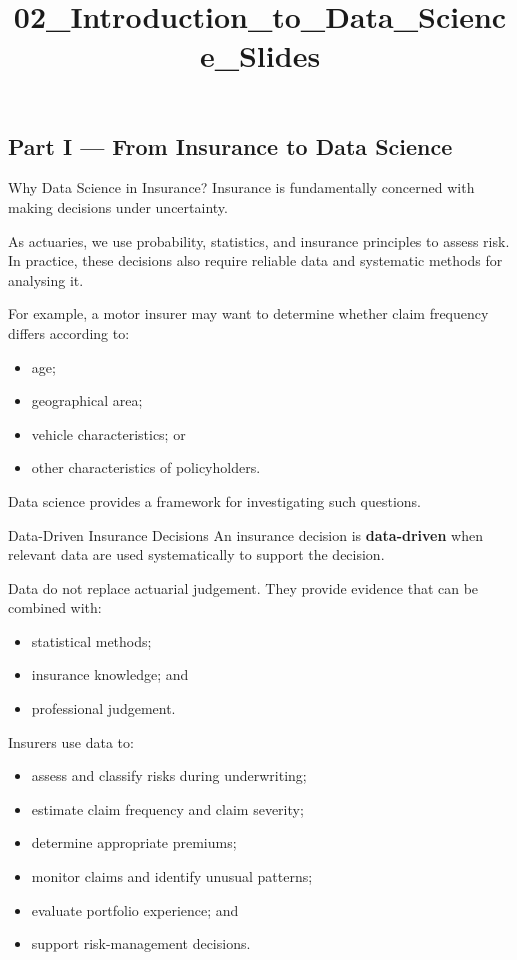 \documentclass[
  ignorenonframetext,
  aspectratio=169,
]{beamer}
\title{\texorpdfstring{02\_Introduction\_to\_Data\_Science\_Slides}{02\_Introduction\_to\_Data\_Science\_Slides}}
\author{}
\date{}
\providecommand{\tightlist}{%
  \setlength{\itemsep}{0pt}\setlength{\parskip}{0pt}}
\begin{document}
\frame{\titlepage}


\subsection{Part I --- From Insurance to Data
Science}\label{part-i-from-insurance-to-data-science}

\begin{frame}{Why Data Science in Insurance?}
\protect{}\label{why-data-science-in-insurance}
Insurance is fundamentally concerned with making decisions under
uncertainty.

As actuaries, we use probability, statistics, and insurance principles
to assess risk. In practice, these decisions also require reliable data
and systematic methods for analysing it.

For example, a motor insurer may want to determine whether claim
frequency differs according to:

\begin{itemize}
\tightlist
\item
  age;
\item
  geographical area;
\item
  vehicle characteristics; or
\item
  other characteristics of policyholders.
\end{itemize}

Data science provides a framework for investigating such questions.
\end{frame}

\begin{frame}{Data-Driven Insurance Decisions}
\protect{}\label{data-driven-insurance-decisions}
An insurance decision is \textbf{data-driven} when relevant data are
used systematically to support the decision.

Data do not replace actuarial judgement. They provide evidence that can
be combined with:

\begin{itemize}
\tightlist
\item
  statistical methods;
\item
  insurance knowledge; and
\item
  professional judgement.
\end{itemize}

Insurers use data to:

\begin{itemize}
\tightlist
\item
  assess and classify risks during underwriting;
\item
  estimate claim frequency and claim severity;
\item
  determine appropriate premiums;
\item
  monitor claims and identify unusual patterns;
\item
  evaluate portfolio experience; and
\item
  support risk-management decisions.
\end{itemize}
\end{frame}
\end{document}
